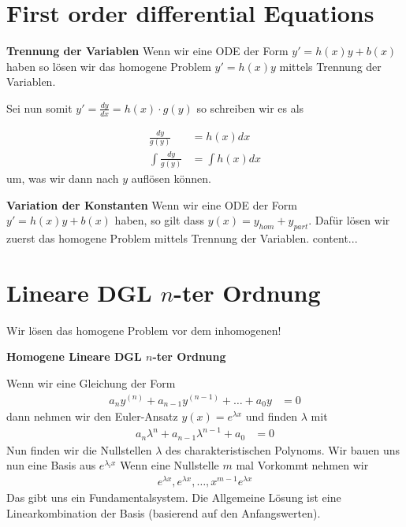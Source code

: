 \documentclass[25pt]{sciposter}
\newenvironment{method}[1]{\begin{mdframed}[backgroundcolor=blue!10,innertopmargin=15pt, innerbottommargin=15pt, nobreak=true]
		\textbf{#1 }
	}
	{ 
	\end{mdframed}
}
\newcommand{\TODO}[1]{\todo[inline]{\Large TODO:  #1}}
\begin{document}
\begin{multicols}{3}









\section*{First order differential Equations}



\begin{method}{Trennung der Variablen} Wenn wir eine ODE der Form $y' = h(x)y + b(x)$ haben so lösen wir das homogene Problem $y' = h(x)y$ mittels Trennung der Variablen.
	
Sei nun somit $y' = \frac{dy}{dx} = h(x)\cdot g(y)$ so schreiben wir es als 

\begin{align*}
	\frac{dy}{g(y)} &= h(x)dx\\
	\int \frac{dy}{g(y)} &= \int h(x)dx
\end{align*}
um, was wir dann nach $y$ auflösen können.
\end{method}


\TODO{beispiele}


\begin{method}{Variation der Konstanten} Wenn wir eine ODE der Form $y' = h(x)y + b(x)$ haben, so gilt dass $y(x) = y_{hom} + y_{part}$. Dafür lösen wir zuerst das homogene Problem mittels Trennung der Variablen.
	content...
\end{method}



\section*{Lineare DGL $n$-ter Ordnung}

Wir lösen das homogene Problem vor dem inhomogenen!

\begin{method}{Homogene Lineare DGL $n$-ter Ordnung}

Wenn wir eine Gleichung der Form
\begin{align*}
a_ny^{(n)} + a_{n-1}y^{(n-1)} + \ldots + a_0 y &= 0
\end{align*}
dann nehmen wir den Euler-Ansatz $y(x) = e^{\lambda x}$ und finden $\lambda$ mit
\begin{align*}
a_n \lambda^n + a_{n-1}\lambda^{n-1} + a_0 &= 0
\end{align*}
Nun finden wir die Nullstellen $\lambda$ des charakteristischen Polynoms. Wir bauen uns nun eine Basis aus $e^{\lambda_i x}$ Wenn eine Nullstelle $m$ mal Vorkommt nehmen wir
\begin{align*}
e^{\lambda x},e^{\lambda x}, \ldots , x^{m-1} e^{\lambda x} 
\end{align*}
Das gibt uns ein Fundamentalsystem. Die Allgemeine Lösung ist eine Linearkombination der Basis (basierend auf den Anfangswerten).
\end{method}


\end{multicols}
\end{document}

